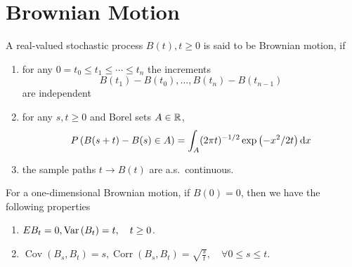 \chapter{Brownian Motion}

\begin{definition}
	A real-valued stochastic process \(B(t),t\geq 0\) is said to be Brownian motion, if
	\begin{enumerate}
		\item for any \(0=t_{0}\leq t_{1}\leq\cdots\leq t_{n}\) the increments
		      \begin{equation*}
			      B\left(t_{1}\right)-B\left(t_{0}\right),\ldots,B\left(t_{n}\right)-B\left(t_{n-1}\right)
		      \end{equation*}
		      are independent
		\item for any \(s,t\geq 0\) and Borel sets \(A\in\mathbb{R}\),
		      \begin{equation}
			      P\left(B(s+t)-B(s)\in A\right)=\int_{A}(2\pi t)^{-1/2}\exp\left(-x^{2}/2t\right)\mathop{}\!\mathrm{d} x
		      \end{equation}
		\item the sample paths \(t\rightarrow B(t)\) are a.s.\ continuous.
	\end{enumerate}
\end{definition}

\begin{property}
	For a one-dimensional Brownian motion, if \(B(0)=0\), then we have the following properties
	\begin{enumerate}
		\item \(EB_{t}=0,\mathrm{Var}\left(B_{t}\right)=t,\quad t\geq 0\).
		\item \(\operatorname{Cov}\left(B_{s},B_{t}\right)=s,\operatorname{Corr}\left(B_{s},B_{t}\right)=\sqrt{\frac{s}{t}},\quad\forall 0\leq s\leq t\).
	\end{enumerate}
\end{property}

